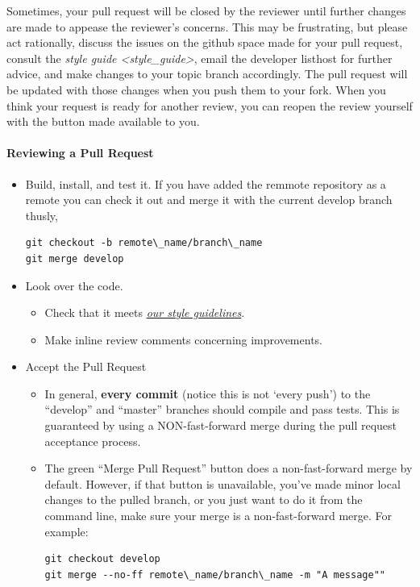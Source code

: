 \documentclass[letterpaper,10pt,english]{sphinxmanual}
\begin{document}
Sometimes, your pull request will be closed by the reviewer until further
changes are made to appease the reviewer's concerns. This may be frustrating,
but please act rationally, discuss the issues on the github space made for your
pull request, consult the \emph{style guide \textless{}style\_guide\textgreater{}},
email the developer listhost for further advice, and make changes to your topic branch
accordingly. The pull request will be updated with those changes when you push them
to your fork.  When you think your request is ready for another review, you can
reopen the review yourself with the button made available to you.


\paragraph{Reviewing a Pull Request}
\label{devdoc/contributing_to_cyclus:reviewing-a-pull-request}\begin{itemize}
\item {} 
Build, install, and test it. If you have added the remmote repository as
a remote you can check it out and merge it with the current develop
branch thusly,

\begin{Verbatim}[commandchars=\\\{\}]
git checkout -b remote\_name/branch\_name
git merge develop
\end{Verbatim}

\item {} 
Look over the code.
\begin{itemize}
\item {} 
Check that it meets {\hyperref[devdoc/style_guide::doc]{\emph{our style guidelines}}}.

\item {} 
Make inline review comments concerning improvements.

\end{itemize}

\item {} 
Accept the Pull Request
\begin{itemize}
\item {} 
In general, \textbf{every commit} (notice this is not `every push') to the
``develop'' and ``master'' branches should compile and pass tests. This
is guaranteed by using a NON-fast-forward merge during the pull request
acceptance process.

\item {} 
The green ``Merge Pull Request'' button does a non-fast-forward merge by
default. However, if that button is unavailable, you've made minor
local changes to the pulled branch, or you just want to do it from the
command line, make sure your merge is a non-fast-forward merge. For example:

\begin{Verbatim}[commandchars=\\\{\}]
git checkout develop
git merge --no-ff remote\_name/branch\_name -m "A message""
\end{Verbatim}

\end{itemize}

\end{itemize}
\end{document}
